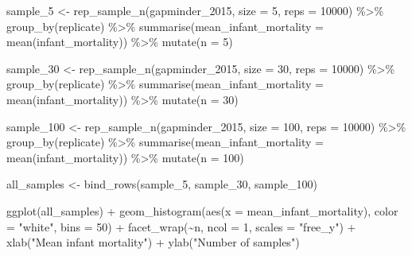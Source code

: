 \documentclass[
  letterpaper,
  DIV=11,
  numbers=noendperiod]{scrreprt}
\newenvironment{Shaded}{\begin{snugshade}}{\end{snugshade}}
\newcommand{\AttributeTok}[1]{\textcolor[rgb]{0.40,0.45,0.13}{#1}}
\newcommand{\DecValTok}[1]{\textcolor[rgb]{0.68,0.00,0.00}{#1}}
\newcommand{\FunctionTok}[1]{\textcolor[rgb]{0.28,0.35,0.67}{#1}}
\newcommand{\NormalTok}[1]{\textcolor[rgb]{0.00,0.23,0.31}{#1}}
\newcommand{\OtherTok}[1]{\textcolor[rgb]{0.00,0.23,0.31}{#1}}
\newcommand{\SpecialCharTok}[1]{\textcolor[rgb]{0.37,0.37,0.37}{#1}}
\newcommand{\StringTok}[1]{\textcolor[rgb]{0.13,0.47,0.30}{#1}}
\theoremstyle{definition}
\theoremstyle{remark}
\begin{document}
\begin{Shaded}
\begin{Highlighting}[]
\NormalTok{sample\_5 }\OtherTok{\textless{}{-}} \FunctionTok{rep\_sample\_n}\NormalTok{(gapminder\_2015, }\AttributeTok{size =} \DecValTok{5}\NormalTok{, }\AttributeTok{reps =} \DecValTok{10000}\NormalTok{) }\SpecialCharTok{\%\textgreater{}\%} 
  \FunctionTok{group\_by}\NormalTok{(replicate) }\SpecialCharTok{\%\textgreater{}\%} 
  \FunctionTok{summarise}\NormalTok{(}\AttributeTok{mean\_infant\_mortality =} \FunctionTok{mean}\NormalTok{(infant\_mortality)) }\SpecialCharTok{\%\textgreater{}\%} 
  \FunctionTok{mutate}\NormalTok{(}\AttributeTok{n =} \DecValTok{5}\NormalTok{)}

\NormalTok{sample\_30 }\OtherTok{\textless{}{-}} \FunctionTok{rep\_sample\_n}\NormalTok{(gapminder\_2015, }\AttributeTok{size =} \DecValTok{30}\NormalTok{, }\AttributeTok{reps =} \DecValTok{10000}\NormalTok{) }\SpecialCharTok{\%\textgreater{}\%} 
  \FunctionTok{group\_by}\NormalTok{(replicate) }\SpecialCharTok{\%\textgreater{}\%} 
  \FunctionTok{summarise}\NormalTok{(}\AttributeTok{mean\_infant\_mortality =} \FunctionTok{mean}\NormalTok{(infant\_mortality)) }\SpecialCharTok{\%\textgreater{}\%} 
  \FunctionTok{mutate}\NormalTok{(}\AttributeTok{n =} \DecValTok{30}\NormalTok{)}

\NormalTok{sample\_100 }\OtherTok{\textless{}{-}} \FunctionTok{rep\_sample\_n}\NormalTok{(gapminder\_2015, }\AttributeTok{size =} \DecValTok{100}\NormalTok{, }\AttributeTok{reps =} \DecValTok{10000}\NormalTok{) }\SpecialCharTok{\%\textgreater{}\%} 
  \FunctionTok{group\_by}\NormalTok{(replicate) }\SpecialCharTok{\%\textgreater{}\%} 
  \FunctionTok{summarise}\NormalTok{(}\AttributeTok{mean\_infant\_mortality =} \FunctionTok{mean}\NormalTok{(infant\_mortality)) }\SpecialCharTok{\%\textgreater{}\%} 
  \FunctionTok{mutate}\NormalTok{(}\AttributeTok{n =} \DecValTok{100}\NormalTok{)}

\NormalTok{all\_samples }\OtherTok{\textless{}{-}} \FunctionTok{bind\_rows}\NormalTok{(sample\_5, sample\_30, sample\_100)}

\FunctionTok{ggplot}\NormalTok{(all\_samples) }\SpecialCharTok{+}
  \FunctionTok{geom\_histogram}\NormalTok{(}\FunctionTok{aes}\NormalTok{(}\AttributeTok{x =}\NormalTok{ mean\_infant\_mortality), }\AttributeTok{color =} \StringTok{"white"}\NormalTok{, }\AttributeTok{bins =} \DecValTok{50}\NormalTok{) }\SpecialCharTok{+}
  \FunctionTok{facet\_wrap}\NormalTok{(}\SpecialCharTok{\textasciitilde{}}\NormalTok{n, }\AttributeTok{ncol =} \DecValTok{1}\NormalTok{, }\AttributeTok{scales =} \StringTok{"free\_y"}\NormalTok{) }\SpecialCharTok{+}
  \FunctionTok{xlab}\NormalTok{(}\StringTok{"Mean infant mortality"}\NormalTok{) }\SpecialCharTok{+}
  \FunctionTok{ylab}\NormalTok{(}\StringTok{"Number of samples"}\NormalTok{)}
\end{Highlighting}
\end{Shaded}
\end{document}
